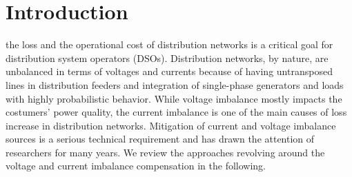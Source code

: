 \documentclass[journal]{IEEEtran}
\begin{document}
\printnomenclature[2.8cm]





\section{Introduction}

 the loss and the operational cost of distribution networks is a critical goal for distribution system operators (DSOs). Distribution networks, by nature, are unbalanced in terms of voltages and currents because of having untransposed lines \cite{paranavithana2009global} in distribution feeders and integration of single-phase generators and loads with highly probabilistic behavior. While voltage imbalance mostly impacts the costumers’ power quality, the current imbalance is one of the main causes of loss increase in distribution networks. Mitigation of current and voltage imbalance sources is a serious technical requirement and has drawn the attention of researchers for many years. We review the approaches revolving around the voltage and current imbalance compensation in the following.
\end{document}
